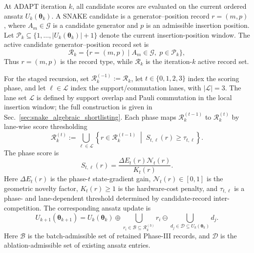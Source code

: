 \documentclass[
  reprint,
  amsmath,
  amssymb,
  aps,
  pra,
  nofootinbib,
  superscriptaddress,
  floatfix
]{revtex4-2}
\newcommand{\Gset}{\mathcal{G}}
\newcommand{\Pcal}{\mathcal{P}}
\begin{document}
At ADAPT iteration $k$, all candidate scores are evaluated on the current ordered ansatz $U_k(\boldsymbol\theta_k)$. A SNAKE candidate is a generator--position record $r=(m,p)$, where $A_m\in\Gset$ is a candidate generator and $p$ is an admissible insertion position. Let $\Pcal_k\subseteq\{1,\ldots,|U_k(\boldsymbol\theta_k)|+1\}$ denote the current insertion-position window. The active candidate generator--position record set is
\begin{equation}
\mathcal R_k
=
\{r=(m,p)\mid A_m\in\Gset,\;p\in\Pcal_k\},
\label{eq:record_set}
\end{equation}
Thus $r=(m,p)$ is the record type, while $\mathcal R_k$ is the iteration-$k$ active record set.

For the staged recursion, set $\mathcal R_k^{(-1)}:=\mathcal R_k$, let $t\in\{0,1,2,3\}$ index the scoring phase, and let $\ell\in\mathcal L$ index the support/commutation lanes, with \(|\mathcal L|=3\). The lane set $\mathcal L$ is defined by support overlap and Pauli commutation in the local insertion window; the full construction is given in Sec.~\ref{sec:snake_algebraic_shortlisting}.
Each phase maps $\mathcal R_k^{(t-1)}$ to $\mathcal R_k^{(t)}$ by lane-wise score thresholding
\begin{equation}
\mathcal R_k^{(t)}
:=
\bigcup_{\ell\in\mathcal L}
\left\{
r\in\mathcal R_k^{(t-1)}
\;\middle|\;
S_{t,\ell}(r)\ge\tau_{t,\ell}
\right\}.
\label{eq:phase_restriction_map}
\end{equation}
The phase score is
\begin{equation}
S_{t,\ell}(r)
=
\frac{\Delta E_t(r)\mathcal N_t(r)}{K_t(r)}.
\label{eq:master_phase_score}
\end{equation}
Here $\Delta E_t(r)$ is the phase-$t$ state-gradient gain, $\mathcal N_t(r)\in[0,1]$ is the geometric novelty factor, \(K_t(r)\geq 1\) is the hardware-cost penalty, and \(\tau_{t,\ell}\) is a phase- and lane-dependent threshold determined by candidate-record inter-competition. The corresponding ansatz update is
\begin{equation}
U_{k+1}(\boldsymbol\theta_{k+1})
=
U_k(\boldsymbol\theta_k)
\oplus
\bigcup_{r_i\in\mathcal B\subseteq\mathcal R_k^{(3)}}r_i
\ominus
\bigcup_{d_j\in\mathcal D\subseteq U_k(\boldsymbol\theta_k)}d_j .
\label{eq:snake_ansatz_update}
\end{equation}
Here $\mathcal B$ is the batch-admissible set of retained Phase-III records, and $\mathcal D$ is the ablation-admissible set of existing ansatz entries.
\end{document}

